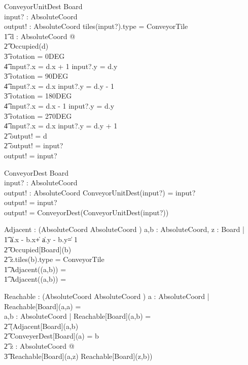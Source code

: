 \documentclass[12pt]{article}
\begin{document}
\begin{schema}{ConveyorUnitDest}
\Xi Board \\
input? : AbsoluteCoord \\
output! : AbsoluteCoord
\where
\IF tiles(input?).type = ConveyorTile \; \; \wedge \\ \t1
\exists d : AbsoluteCoord @ \\ \t2
\IF \neg Occupied(d) \; \; \wedge \\ \t3
rotation = 0DEG \Rightarrow \\ \t4 input?.x = d.x + 1 \wedge input?.y = d.y \\ \t3
rotation = 90DEG \Rightarrow \\ \t4 input?.x = d.x \wedge input?.y = d.y - 1
\\ \t3
rotation = 180DEG \Rightarrow \\ \t4 input?.x = d.x - 1 \wedge input?.y = d.y \\ \t3
rotation = 270DEG \Rightarrow \\ \t4 input?.x = d.x \wedge input?.y = d.y + 1 \\ \t2
\THEN output! = d \\ \t2
\ELSE output! = input? \\
\ELSE output! = input?
\end{schema}

\begin{schema}{ConveyorDest}
\Xi Board \\
input? : AbsoluteCoord \\
output! : AbsoluteCoord
\where
\IF  ConveyorUnitDest(input?) = input? \\
\THEN output! = input? \\
\ELSE output! = ConveyorDest(ConveyorUnitDest(input?))
\end{schema}

\begin{gendef}[Board]
Adjacent : \power (AbsoluteCoord \times AbsoluteCoord \pfun \bool)
\where
\forall a,b : AbsoluteCoord, z : Board |\\ \t1
\IF \|a.x - b.x\| + \|a.y - b.y\| = 1 \\ \t2
\neg Occupied[Board](b) \\ \t2
z.tiles(b).type \not = ConveyorTile \\ \t1
\THEN Adjacent((a,b)) = \true \\ \t1
\ELSE Adjacent((a,b)) = \false
\end{gendef}

\begin{gendef}[Board]
Reachable : \power (AbsoluteCoord \times AbsoluteCoord \pfun \bool)
\where
\forall a : AbsoluteCoord | Reachable[Board](a,a) = \true \\
\forall a,b : AbsoluteCoord | Reachable[Board](a,b) = \\ \t2 (Adjacent[Board](a,b) \: \vee \\ \t2 ConveyerDest[Board](a) = b \: \vee \\ \t2
\exists z : AbsoluteCoord @ \\ \t3 Reachable[Board](a,z) \wedge Reachable[Board](z,b))
\end{gendef}
\end{document}
